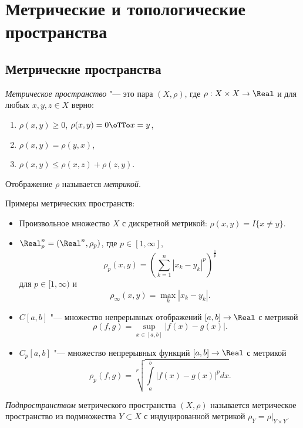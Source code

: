 \documentclass[main]{subfiles}
\begin{document}
\section{Метрические и топологические пространства}
\subsection{Метрические пространства}

\begin{definition}
  \emph{Метрическое пространство} "--- это
  пара \( (X, \rho) \), где \( \rho : X \times X \to \Real \) и
  для любых \( x, y, z \in X \) верно:
  \begin{enumerate}
    \item \( \rho(x, y) \ge 0 \), \( \rho(x, y) = 0 \oTTo x = y \),
    \item \( \rho(x, y) = \rho(y, x) \),
    \item \( \rho(x, y) \le \rho(x, z) + \rho(z, y) \).
  \end{enumerate}
  Отображение \( \rho \) называется \emph{метрикой}.
\end{definition}

Примеры метрических пространств:
\begin{itemize}
  \item Произвольное множество \( X \)
    с дискретной метрикой:
    \( \rho(x, y) = I\{ x \ne y \} \).
  \item 
    \( \Real^n_p = (\Real^n, \rho_p) \),
    где \( p \in [1, \infty] \),
    \[
      \rho_p(x, y) =
      \left( \sum_{k=1}^{n}
        |x_k - y_k|^p
      \right)^{\frac1p}
    \]
    для \( p \in [1, \infty) \)
    и
    \[
      \rho_\infty(x, y) = \max_k |x_k - y_k|.
    \]
  \item 
    \( C[a, b] \) "--- множество непрерывных отображений
    \( [a, b] \to \Real \)
    с метрикой
    \[
      \rho(f, g) = \sup_{x \in [a, b]} |f(x) - g(x)|.
    \]
  \item \( C_p[a, b] \) "---
    множество непрерывных функций
    \( [a, b] \to \Real \)
    с метрикой
    \[
      \rho_p(f, g) =
      \sqrt[p]{\int\limits_a^b |f(x) - g(x)|^p dx}.
    \]
\end{itemize}

\begin{definition}
  \emph{Подпространством} метрического пространства \( (X, \rho) \)
  называется метрическое пространство из
  подмножества \( Y \subset X \)
  с индуцированной метрикой
  \( \rho_Y = \rho\bigr|_{Y \times Y} \).
\end{definition}
\end{document}
